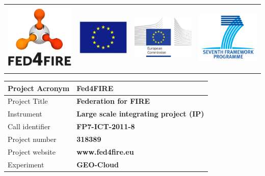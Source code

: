 \documentclass[a4paper]{article}
\title{}
\author{Ruben Perez Pascual}
\date{2014-07-04T11:27:00Z}
\begin{document}
\begin{flushleft}
\tablehead{}
\begin{supertabular}{llll}
 &
 &
 &
\\
\end{supertabular}
\end{flushleft}

\bigskip


\bigskip

\begin{flushleft}
\tablehead{}
\begin{supertabular}{|m{1.98856in}|m{4.25246in}|}
\hline
Project Acronym &
\bfseries Fed4FIRE\\\hline
Project Title &
\bfseries Federation for FIRE\\\hline
Instrument &
\bfseries Large scale integrating project (IP)\\\hline
Call identifier &
\bfseries FP7-ICT-2011-8\\\hline
Project number &
\bfseries 318389\\\hline
Project website &
\bfseries www.fed4fire.eu\\\hline
Experiment &
\bfseries GEO-Cloud\\\hline
\end{supertabular}
\end{flushleft}
\end{document}
